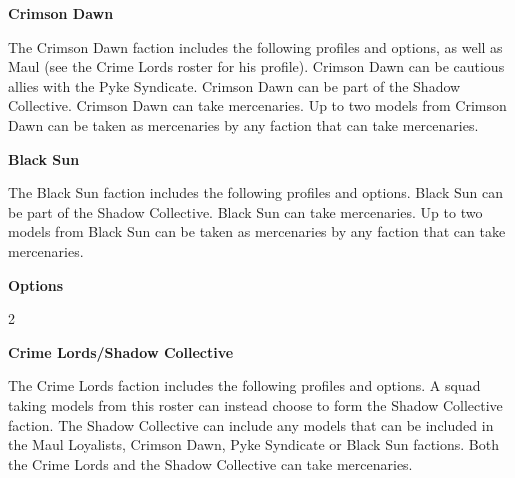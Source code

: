 \documentclass{article}
\begin{document}
\newpage


{\Large \textbf{Crimson Dawn}}
\vspace{0.3cm}

\begin{minipage}{19cm}
    The Crimson Dawn faction includes the following profiles and options, as well
    as Maul (see the Crime Lords roster for his profile). Crimson Dawn can be cautious
    allies with the Pyke Syndicate. Crimson Dawn can be part of the Shadow Collective.
    Crimson Dawn can take mercenaries.
    Up to two models from Crimson Dawn can be taken as mercenaries
    by any faction that can take mercenaries.
\end{minipage}

\vspace{0.3cm}
{\scriptsize
\setlength\extrarowheight{1.5pt}

}
\vspace{0.6cm}

{\Large \textbf{Black Sun}}
\vspace{0.3cm}

\begin{minipage}{19cm}
    The Black Sun faction includes the following profiles and options.
    Black Sun can be part of the Shadow Collective.
    Black Sun can take mercenaries.
    Up to two models from Black Sun can be taken as mercenaries
    by any faction that can take mercenaries.
\end{minipage}

\vspace{0.3cm}
{\scriptsize
\setlength\extrarowheight{1.5pt}

}
\vspace{0.6cm}

{\large \textbf{Options}}
\vspace{0.3cm}
\begin{multicols}{2}
    {\scriptsize

    \setlength\extrarowheight{1.5pt}
    

    }
\end{multicols}

\vspace{0.6cm}

{\Large \textbf{Crime Lords/Shadow Collective}}
\vspace{0.3cm}

\begin{minipage}{19cm}
    The Crime Lords faction includes the following profiles and options.
    A squad taking models from this roster can instead choose to form the
    Shadow Collective faction. 
    The Shadow Collective can include any models that can be included 
    in the Maul Loyalists, Crimson Dawn, Pyke Syndicate or Black Sun factions.
    Both the Crime Lords and the Shadow Collective can take mercenaries.

\end{minipage}
\end{document}
